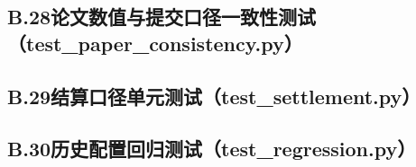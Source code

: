 \subsection*{B.28\quad 论文数值与提交口径一致性测试（test\_paper\_consistency.py）}


\subsection*{B.29\quad 结算口径单元测试（test\_settlement.py）}


\subsection*{B.30\quad 历史配置回归测试（test\_regression.py）}

